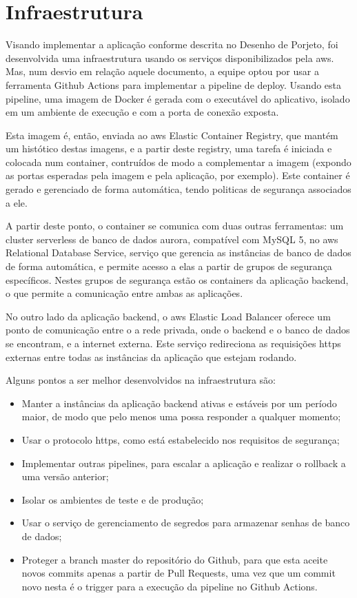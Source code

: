 \chapter{Infraestrutura}

Visando implementar a aplicação conforme descrita no Desenho de
Porjeto, foi desenvolvida uma infraestrutura usando os serviços
disponibilizados pela \gls{aws}.  Mas, num desvio em relação
aquele documento, a equipe optou por usar a ferramenta Github Actions
para implementar a \gls{pipeline} de \gls{deploy}.  Usando esta \gls{pipeline}, uma
imagem de Docker é gerada com o executável do aplicativo, isolado em
um ambiente de execução e com a porta de conexão exposta.

Esta imagem é, então, enviada ao \gls{aws} Elastic Container Registry, que
mantém um histótico destas imagens, e a partir deste registry, uma
tarefa é iniciada e colocada num container, contruídos de modo a
complementar a imagem (expondo as portas esperadas pela imagem e pela
aplicação, por exemplo). Este container é gerado e gerenciado de forma
automática, tendo politicas de segurança associados a ele.

A partir deste ponto, o container se comunica com duas outras
ferramentas: um cluster serverless de banco de dados aurora,
compatível com MySQL 5, no \gls{aws} Relational Database Service, serviço
que gerencia as instâncias de banco de dados de forma automática, e
permite acesso a elas a partir de grupos de segurança
específicos. Nestes grupos de segurança estão os containers da
aplicação \gls{backend}, o que permite a comunicação entre ambas as
aplicações.

No outro lado da aplicação \gls{backend}, o \gls{aws} Elastic Load Balancer
oferece um ponto de comunicação entre o a rede privada, onde o \gls{backend}
e o banco de dados se encontram, e a internet externa. Este serviço
redireciona as requisições \gls{https} externas entre todas as instâncias da
aplicação que estejam rodando.

Alguns pontos a ser melhor desenvolvidos na infraestrutura são:
\begin{itemize}
\item Manter a instâncias da aplicação \gls{backend} ativas e estáveis por
  um período maior, de modo que pelo menos uma possa responder a
  qualquer momento;
\item Usar o protocolo \gls{https}, como está estabelecido nos requisitos de
  segurança;
\item Implementar outras \glspl{pipeline}, para escalar a aplicação e
  realizar o \gls{rollback} a uma versão anterior;
\item Isolar os ambientes de teste e de produção;
\item Usar o serviço de gerenciamento de segredos para armazenar
  senhas de banco de dados;
\item Proteger a \gls{branch} master do repositório do Github, para
  que esta aceite novos \glspl{commit} apenas a partir de Pull Requests, uma
  vez que um \gls{commit} novo nesta é o trigger para a execução da \gls{pipeline}
  no Github Actions.
\end{itemize}